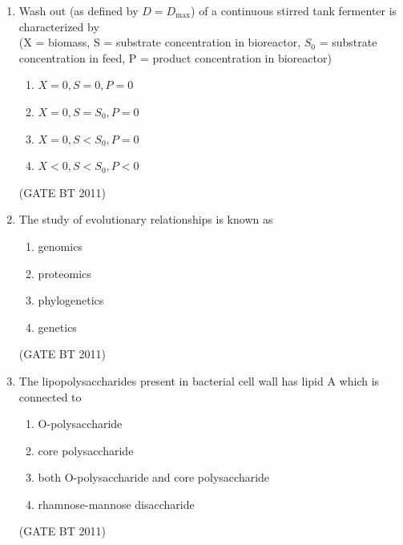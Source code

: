 \documentclass[journal,12pt,onecolumn]{IEEEtran}
\begin{document}
\begin{enumerate}
    P. turn over of the cell material 
    
    Q. maintenance of intracellular pH 
    
    R. motility  
    
    S. increase in cell number 

    \begin{multicols}{2}
    \begin{enumerate}
        \item P, Q and S only
        \item Q, R and S only
        \item P, Q and R only
        \item S only
    \end{enumerate}
    \end{multicols} \hfill(GATE BT 2011)
    
\item Wash out (as defined by $D = D_{\text{max}}$) of a continuous stirred tank fermenter is characterized by \\
(X = biomass, S = substrate concentration in bioreactor, $S_0$ = substrate concentration in feed, P = product concentration in bioreactor)  
\begin{multicols}{2}
\begin{enumerate}
\item $X = 0, S = 0, P = 0$  
\item $X = 0, S = S_0, P = 0$  
\item $X = 0, S < S_0, P = 0$  
\item $X < 0, S < S_0, P < 0$  
\end{enumerate}
\end{multicols} \hfill(GATE BT 2011)

\item The study of evolutionary relationships is known as  
\begin{multicols}{2}
\begin{enumerate}
\item genomics  
\item proteomics  
\item phylogenetics  
\item genetics  
\end{enumerate}
\end{multicols} \hfill(GATE BT 2011)

\item The lipopolysaccharides present in bacterial cell wall has lipid A which is connected to  
\begin{enumerate}
\item O-polysaccharide  
\item core polysaccharide  
\item both O-polysaccharide and core polysaccharide  
\item rhamnose-mannose disaccharide  
\end{enumerate}
\hfill(GATE BT 2011)


\end{enumerate}
\end{document}
